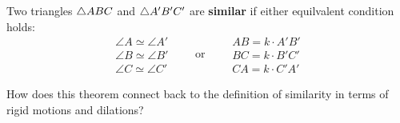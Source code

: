 \begin{theorem} 
Two triangles $\triangle ABC$ and $\triangle A'B'C'$ are 
\textbf{similar} if either equilvalent condition holds:
\[
\begin{array}{l}
\angle A \simeq \angle A'\\
\angle B \simeq \angle B' \\
\angle C \simeq \angle C'
\end{array}
\qquad\text{or}\qquad
\begin{array}{l}
AB = k\cdot A'B'\\
BC = k\cdot B'C' \\
CA = k\cdot C'A'
\end{array}
\]
\end{theorem}

\begin{question}
How does this theorem connect back to the definition of similarity in terms of rigid motions and dilations? 
\end{question}
\QM

%
%
%
%
%

%
%
%


